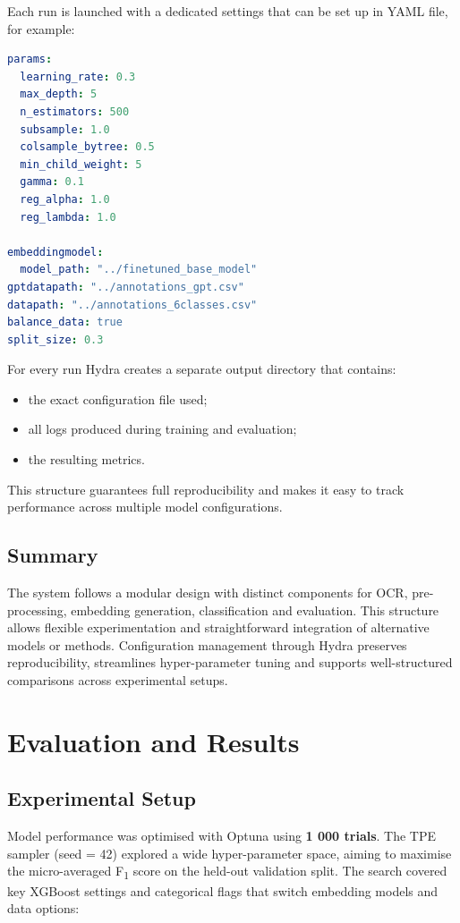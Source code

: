 \documentclass{SGGW-thesis-EN}
\begin{document}
Each run is launched with a dedicated settings that can be set up in YAML file, for example:
\begin{lstlisting}[language=yaml, caption=Sample Hydra configuration]
params:
  learning_rate: 0.3
  max_depth: 5
  n_estimators: 500
  subsample: 1.0
  colsample_bytree: 0.5
  min_child_weight: 5
  gamma: 0.1
  reg_alpha: 1.0
  reg_lambda: 1.0

embeddingmodel:
  model_path: "../finetuned_base_model"
gptdatapath: "../annotations_gpt.csv"
datapath: "../annotations_6classes.csv"
balance_data: true
split_size: 0.3
\end{lstlisting}

For every run Hydra creates a separate output directory that contains:
\begin{itemize}
  \item the exact configuration file used;
  \item all logs produced during training and evaluation;
  \item the resulting metrics.
\end{itemize}

This structure guarantees full reproducibility and makes it easy to track performance across multiple model
configurations.

\section{Summary}
The system follows a modular design with distinct components for OCR, pre-processing, embedding generation, classification
and evaluation. This structure allows flexible experimentation and straightforward integration of alternative models or
methods. Configuration management through Hydra preserves reproducibility, streamlines hyper-parameter tuning and
supports well-structured comparisons across experimental setups.


\chapter{Evaluation and Results}
\section{Experimental Setup}
Model performance was optimised with Optuna using \textbf{1 000 trials}. The TPE sampler (seed = 42) explored a wide
hyper-parameter space, aiming to maximise the micro-averaged F\textsubscript{1} score on the held-out validation split.
The search covered key XGBoost settings and categorical flags that switch embedding models and data options:
\end{document}
